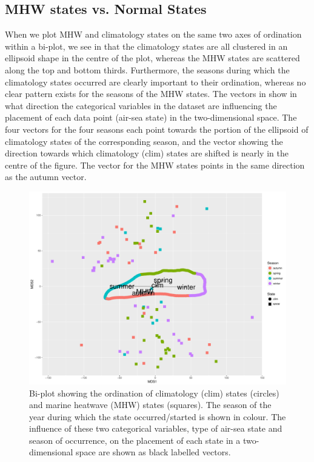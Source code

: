 \documentclass[a4paper,10pt,review]{elsarticle}
\begin{document}
\subsection{MHW states vs. Normal States}
When we plot MHW and climatology states on the same two axes of ordination within a bi-plot, we see in  that the climatology states are all clustered in an ellipsoid shape in the centre of the plot, whereas the MHW states are scattered along the top and bottom thirds. Furthermore, the seasons during which the climatology states occurred are clearly important to their ordination, whereas no clear pattern exists for the seasons of the MHW states. The vectors in  show in what direction the categorical variables in the dataset are influencing the placement of each data point (air-sea state) in the two-dimensional space. The four vectors for the four seasons each point towards the portion of the ellipsoid of climatology states of the corresponding season, and  the vector showing the direction towards which climatology (clim) states are shifted is nearly in the centre of the figure. The vector for the MHW states points in the same direction as the autumn vector.

\begin{figure}
\includegraphics[width=1.0\textwidth]{figure_3.pdf}
\caption{Bi-plot showing the ordination of climatology (clim) states (circles) and marine heatwave (MHW) states (squares). The season of the year during which the state occurred/started is shown in colour. The influence of these two categorical variables, type of air-sea state and season of occurrence, on the placement of each state in a two-dimensional space are shown as black labelled vectors.}
\label{figure3}
\end{figure}
\end{document}
